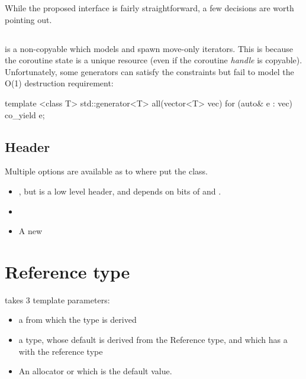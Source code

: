 \documentclass{wg21}
\begin{document}
While the proposed  interface is fairly straightforward, a few decisions are worth pointing out.

\subsection{}

 is a non-copyable  which models  and spawn move-only iterators.
This is because the coroutine state is a unique resource (even if the coroutine \textit{handle} is copyable).
Unfortunately, some generators can satisfy the  constraints but fail to model the  O(1)
destruction requirement:

\begin{colorblock}
    template <class T>
    std::generator<T> all(vector<T> vec) {
        for (auto& e : vec)  {
            co_yield e;
        }
    }
\end{colorblock}



\subsection{Header}

Multiple options are available as to where put the  class.

\begin{itemize}
    \item {}, but  is a low level header,
      and  depends on bits of  and .

    \item {}

    \item A new 

\end{itemize}

\section{Reference type}

 takes 3 template parameters:


\begin{itemize}
\item a  from which the  type is derived
\item a  type, whose default is derived from the Reference type, and which has a  with the reference type
\item An allocator or  which is the default value.
\end{itemize}
\end{document}
